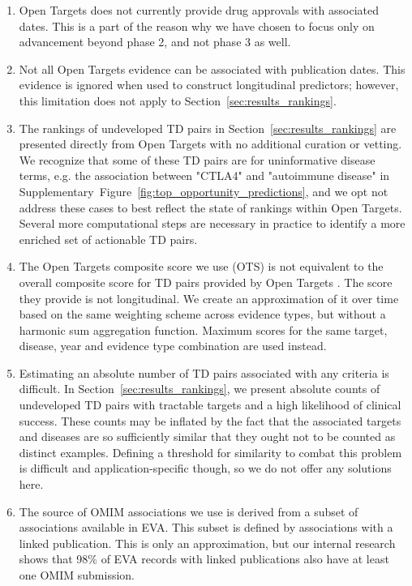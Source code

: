 \documentclass{article}
\begin{document}
\begin{enumerate}[topsep=0pt,itemsep=-1ex,partopsep=1ex,parsep=1ex]
  \item Open Targets does not currently provide drug approvals with associated dates. This is a part of the reason why we have chosen to focus only on advancement beyond phase 2, and not phase 3 as well. 
  \item Not all Open Targets evidence can be associated with publication dates. This evidence is ignored when used to construct longitudinal predictors; however, this limitation does not apply to Section~\ref{sec:results_rankings}.
  \item The rankings of undeveloped TD pairs in Section~\ref{sec:results_rankings} are presented directly from Open Targets with no additional curation or vetting. We recognize that some of these TD pairs are for uninformative disease terms, e.g. the association between "CTLA4" and "autoimmune disease" in Supplementary~Figure~\ref{fig:top_opportunity_predictions}, and we opt not address these cases to best reflect the state of rankings within Open Targets. Several more computational steps are necessary in practice to identify a more enriched set of actionable TD pairs.
  \item The Open Targets composite score we use (OTS) is not equivalent to the overall composite score for TD pairs provided by Open Targets \cite{OTscoring}. The score they provide is not longitudinal. We create an approximation of it over time based on the same weighting scheme across evidence types, but without a harmonic sum aggregation function. Maximum scores for the same target, disease, year and evidence type combination are used instead.
  \item Estimating an absolute number of TD pairs associated with any criteria is difficult. In Section~\ref{sec:results_rankings}, we present absolute counts of undeveloped TD pairs with tractable targets and a high likelihood of clinical success. These counts may be inflated by the fact that the associated targets and diseases are so sufficiently similar that they ought not to be counted as distinct examples. Defining a threshold for similarity to combat this problem is difficult and application-specific though, so we do not offer any solutions here.
  \item The source of OMIM associations we use is derived from a subset of associations available in EVA. This subset is defined by associations with a linked publication. This is only an approximation, but our internal research shows that 98\% of EVA records with linked publications also have at least one OMIM submission.
\end{enumerate}
\end{document}
